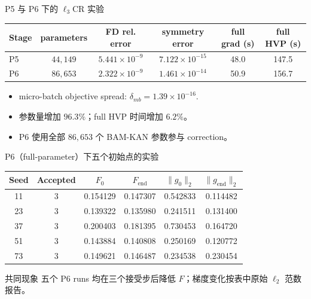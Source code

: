 \begin{frame}{P5 与 P6 下的 $\ell_3$CR 实验}
\scriptsize
\begin{table}
\centering
\begin{tabular}{lccccc}
\toprule
Stage & parameters & FD rel. error & symmetry error & full grad (s) & full HVP (s) \\
\midrule
P5 & $44{,}149$ & $5.441\times10^{-9}$ & $7.122\times10^{-15}$ & 48.0 & 147.5 \\
P6 & $86{,}653$ & $2.322\times10^{-9}$ & $1.461\times10^{-14}$ & 50.9 & 156.7 \\
\bottomrule
\end{tabular}
\end{table}
\begin{itemize}
\item micro-batch objective spread: $\delta_{mb}=1.39\times10^{-16}$.
\item 参数量增加 $96.3\%$；full HVP 时间增加 $6.2\%$。
\item P6 使用全部 $86{,}653$ 个 BAM-KAN 参数参与 correction。
\end{itemize}
\end{frame}

\begin{frame}{P6（full-parameter）下五个初始点的实验}
\scriptsize
\begin{table}
\centering
\begin{tabular}{cccccc}
\toprule
Seed & Accepted & $F_0$ & $F_{\mathrm{end}}$ & $\|g_0\|_2$ & $\|g_{\mathrm{end}}\|_2$ \\
\midrule
11 & 3 & 0.154129 & 0.147307 & 0.542833 & 0.114482 \\
23 & 3 & 0.139322 & 0.135980 & 0.241511 & 0.131400 \\
37 & 3 & 0.200403 & 0.181395 & 0.730453 & 0.164720 \\
51 & 3 & 0.143884 & 0.140808 & 0.250169 & 0.120772 \\
73 & 3 & 0.149621 & 0.146487 & 0.234538 & 0.230454 \\
\bottomrule
\end{tabular}
\end{table}
\begin{block}{共同现象}
五个 P6 runs 均在三个接受步后降低 $F$；梯度变化按表中原始 $\ell_2$ 范数报告。
\end{block}
\end{frame}

